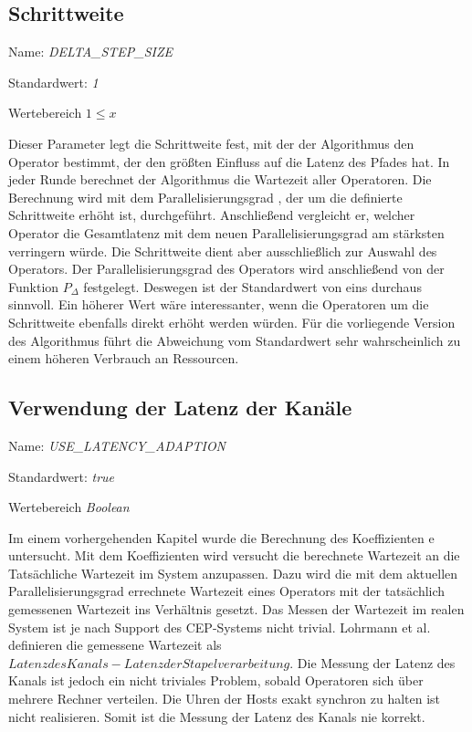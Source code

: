 \subsection{Schrittweite}

Name: \textit{DELTA\_STEP\_SIZE}

Standardwert: \textit{1}

Wertebereich \textit{\(1 \leq x\)}

Dieser Parameter legt die Schrittweite fest, mit der der Algorithmus den Operator bestimmt, der den größten Einfluss auf die Latenz des Pfades hat.
In jeder Runde berechnet der Algorithmus die Wartezeit aller Operatoren.
Die Berechnung wird mit dem Parallelisierungsgrad , der um die definierte Schrittweite erhöht ist, durchgeführt. 
Anschließend vergleicht er, welcher Operator die Gesamtlatenz mit dem neuen Parallelisierungsgrad am stärksten verringern würde.
Die Schrittweite dient aber ausschließlich zur Auswahl des Operators.
Der Parallelisierungsgrad des Operators wird anschließend von der Funktion \(P_\Delta\) festgelegt.
Deswegen ist der Standardwert von eins durchaus sinnvoll.
Ein höherer Wert wäre interessanter, wenn die Operatoren um die Schrittweite ebenfalls direkt erhöht werden würden.
Für die vorliegende Version des Algorithmus führt die Abweichung vom Standardwert sehr wahrscheinlich zu einem höheren Verbrauch an Ressourcen.

\subsection{Verwendung der Latenz der Kanäle}

Name: \textit{USE\_LATENCY\_ADAPTION}

Standardwert: \textit{true}

Wertebereich \textit{Boolean}

Im einem vorhergehenden Kapitel wurde die Berechnung des Koeffizienten e untersucht.
Mit dem Koeffizienten wird versucht die berechnete Wartezeit an die Tatsächliche Wartezeit im System anzupassen.
Dazu wird die mit dem aktuellen Parallelisierungsgrad errechnete Wartezeit eines Operators mit der tatsächlich gemessenen Wartezeit ins Verhältnis gesetzt.
Das Messen der Wartezeit im realen System ist je nach Support des CEP-Systems nicht trivial.
Lohrmann et al. definieren die gemessene Wartezeit als \(Latenz des Kanals - Latenz der Stapelverarbeitung\).
Die Messung der Latenz des Kanals ist jedoch ein nicht triviales Problem, sobald Operatoren sich über mehrere Rechner verteilen.
Die Uhren der Hosts exakt synchron zu halten ist nicht realisieren.
Somit ist die Messung der Latenz des Kanals nie korrekt.

